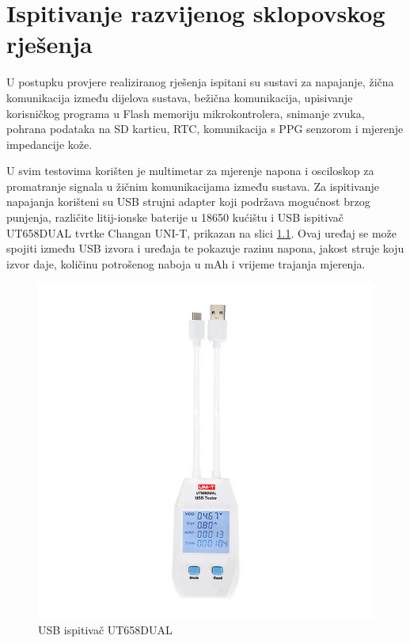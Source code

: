 \chapter{Ispitivanje razvijenog sklopovskog rješenja}
U postupku provjere realiziranog rješenja ispitani su sustavi za napajanje, žična komunikacija između dijelova sustava, bežična komunikacija, upisivanje korisničkog programa u Flash memoriju mikrokontrolera, snimanje zvuka, pohrana podataka na SD karticu, RTC, komunikacija s PPG senzorom i mjerenje impedancije kože.

U svim testovima korišten je multimetar za mjerenje napona i osciloskop za promatranje signala u žičnim komunikacijama između sustava. Za ispitivanje napajanja korišteni su USB strujni adapter koji podržava mogućnost brzog punjenja, različite litij-ionske baterije u 18650 kućištu i USB ispitivač UT658DUAL tvrtke Changan UNI-T, prikazan na slici \ref{slk:UT658DUAL}. Ovaj uređaj se može spojiti između USB izvora i uređaja te pokazuje razinu napona, jakost struje koju izvor daje, količinu potrošenog naboja u mAh i vrijeme trajanja mjerenja.
\begin{figure}[htb]
    \centering
    \includegraphics[width=6 cm]{Figures/UT658DUAL.png}
    \caption{USB ispitivač UT658DUAL}
    \label{slk:UT658DUAL}
\end{figure}
